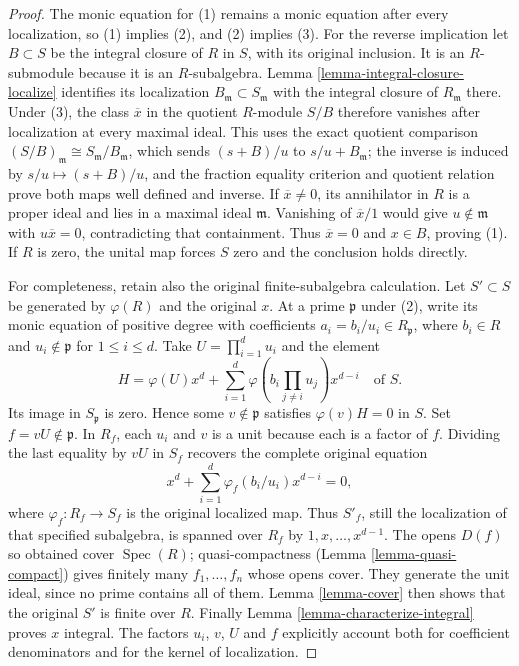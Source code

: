 \begin{proof}
The monic equation for (1) remains a monic equation after every
localization, so (1) implies (2), and (2) implies (3).
For the reverse implication let $B\subset S$ be the integral
closure of $R$ in $S$, with its original inclusion. It is an
$R$-submodule because it is an $R$-subalgebra. Lemma
\ref{lemma-integral-closure-localize} identifies its localization
$B_{\mathfrak m}\subset S_{\mathfrak m}$ with the integral closure
of $R_{\mathfrak m}$ there. Under (3), the class $\overline x$
in the quotient $R$-module $S/B$ therefore vanishes after localization
at every maximal ideal. This uses the exact quotient comparison
$(S/B)_{\mathfrak m}\cong S_{\mathfrak m}/B_{\mathfrak m}$,
which sends $(s+B)/u$ to $s/u+B_{\mathfrak m}$; the inverse is
induced by $s/u\mapsto(s+B)/u$, and the fraction equality criterion
and quotient relation prove both maps well defined and inverse.
If $\overline x\ne0$, its annihilator in $R$ is a proper ideal
and lies in a maximal ideal $\mathfrak m$. Vanishing of
$\overline x/1$ would give $u\notin\mathfrak m$ with
$u\overline x=0$, contradicting that containment. Thus
$\overline x=0$ and $x\in B$, proving (1). If $R$ is zero,
the unital map forces $S$ zero and the conclusion holds directly.

For completeness, retain also the original finite-subalgebra
calculation. Let $S'\subset S$ be generated by $\varphi(R)$ and
the original $x$. At a prime $\mathfrak p$ under (2), write its
monic equation of positive degree with coefficients
$a_i=b_i/u_i\in R_{\mathfrak p}$,
where $b_i\in R$ and $u_i\notin\mathfrak p$ for $1\leq i\leq d$.
Take $U=\prod_{i=1}^d u_i$ and the element
$$
H=\varphi(U)x^d+
\sum_{i=1}^d\varphi\left(b_i\prod_{j\ne i}u_j\right)x^{d-i}
\quad\text{of }S.
$$
Its image in $S_{\mathfrak p}$ is zero. Hence some
$v\notin\mathfrak p$ satisfies $\varphi(v)H=0$ in $S$.
Set $f=vU\notin\mathfrak p$. In $R_f$, each $u_i$ and $v$
is a unit because each is a factor of $f$. Dividing the last
equality by $vU$ in $S_f$ recovers the complete original equation
$$
x^d+\sum_{i=1}^d\varphi_f(b_i/u_i)x^{d-i}=0,
$$
where $\varphi_f:R_f\to S_f$ is the original localized map.
Thus $S'_f$, still the localization of that specified subalgebra,
is spanned over $R_f$ by $1,x,\ldots,x^{d-1}$.
The opens $D(f)$ so obtained cover $\operatorname{Spec}(R)$;
quasi-compactness (Lemma \ref{lemma-quasi-compact}) gives finitely
many $f_1,\ldots,f_n$ whose opens cover. They generate the unit
ideal, since no prime contains all of them. Lemma \ref{lemma-cover}
then shows that the original $S'$ is finite over $R$. Finally
Lemma \ref{lemma-characterize-integral} proves $x$ integral.
The factors $u_i$, $v$, $U$ and $f$ explicitly account both for
coefficient denominators and for the kernel of localization.
\end{proof}